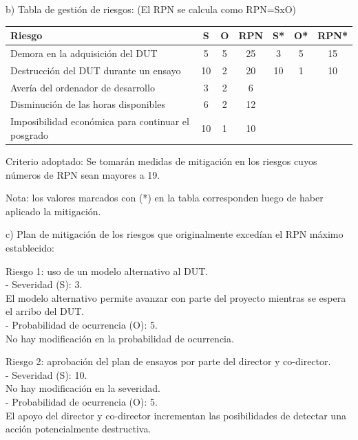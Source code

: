 \documentclass[
11pt, %
]{charter}
\begin{document}
b) Tabla de gestión de riesgos:      (El RPN se calcula como RPN=SxO)

\begin{table}[htpb]
\centering
\begin{tabularx}{\linewidth}{@{}|X|c|c|c|c|c|c|@{}}
\hline
\rowcolor[HTML]{C0C0C0} 
Riesgo                                             & S & O & RPN & S* & O* & RPN* \\ \hline
Demora en la adquisición del DUT                   & 5 & 5 & 25  &3   & 5  & 15   \\ \hline
Destrucción del DUT durante un ensayo              &10 & 2 & 20  &10  & 1  & 10   \\ \hline
Avería del ordenador de desarrollo                 & 3 & 2 & 6   &    &    &      \\ \hline
Disminución de las horas disponibles               & 6 & 2 & 12  &    &    &      \\ \hline
Imposibilidad económica para continuar el posgrado &10 & 1 & 10  &    &    &      \\ \hline
\end{tabularx}%
\end{table}

Criterio adoptado: 
Se tomarán medidas de mitigación en los riesgos cuyos números de RPN sean mayores a 19.

Nota: los valores marcados con (*) en la tabla corresponden luego de haber aplicado la mitigación.

c) Plan de mitigación de los riesgos que originalmente excedían el RPN máximo establecido:
 
Riesgo 1: uso de un modelo alternativo al DUT. \\
  - Severidad (S): 3. \\
  El modelo alternativo permite avanzar con parte del proyecto mientras se espera el arribo del DUT. \\
  - Probabilidad de ocurrencia (O): 5. \\
  No hay modificación en la probabilidad de ocurrencia.

Riesgo 2: aprobación del plan de ensayos por parte del director y co-director. \\
  - Severidad (S): 10. \\
  No hay modificación en la severidad. \\
  - Probabilidad de ocurrencia (O): 5. \\
  El apoyo del director y co-director incrementan las posibilidades de detectar una acción potencialmente destructiva.
\end{document}
